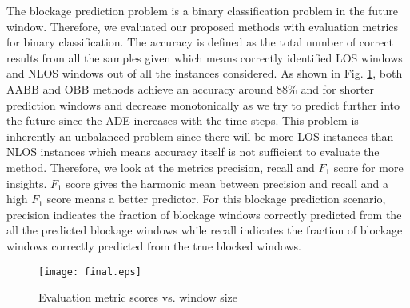 \documentclass[conference]{IEEEtran}
\begin{document}
The blockage prediction problem is a binary classification problem in the future window. Therefore, we evaluated our proposed methods with evaluation metrics for binary classification. The accuracy is defined as the total number of correct results from all the samples given which means correctly identified LOS windows and NLOS windows out of all the instances considered. As shown in Fig. \ref{results}, both AABB and OBB methods achieve an accuracy around 88\% and for shorter prediction windows and decrease monotonically as we try to predict further into the future since the ADE increases with the time steps. This problem is inherently an unbalanced problem since there will be more LOS instances than NLOS instances which means accuracy itself is not sufficient to evaluate the method. Therefore, we look at the metrics precision, recall and $F_1$ score for more insights. $F_1$ score gives the harmonic mean between precision and recall and a high $F_1$ score means a better predictor.
For this blockage prediction scenario, precision indicates the fraction of blockage windows correctly predicted from the all the predicted blockage windows while recall indicates the fraction of blockage windows correctly predicted from the true blocked windows. 



\begin{figure}[t]
    \centering
    \texttt{[image: final.eps]}
    \caption{Evaluation metric scores vs. window size}
    \label{results}
\end{figure}
\end{document}
